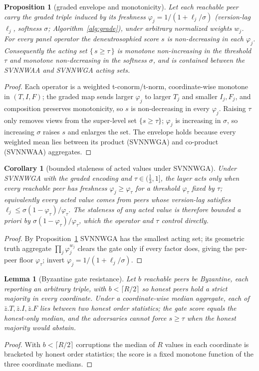 \documentclass[11pt]{article}
\newtheorem{proposition}{Proposition}
\newtheorem{lemma}{Lemma}
\newtheorem{corollary}{Corollary}
\begin{document}
\begin{proposition}[graded envelope and monotonicity]\label{prop:graded}
Let each reachable peer carry the graded triple induced by its freshness $\varphi_j=1/(1+\ell_j/\sigma)$
(version-lag $\ell_j$, softness $\sigma$; Algorithm~\ref{alg:grade}), under arbitrary normalized weights
$w_j$. For every panel operator the deneutrosophied score $s$ is non-decreasing in each $\varphi_j$.
Consequently the acting set $\{\,s\ge\tau\,\}$ is monotone non-increasing in the threshold $\tau$ and
monotone non-decreasing in the softness $\sigma$, and is contained between the SVNNWAA and SVNNWGA acting
sets.
\end{proposition}
\begin{proof}
Each operator is a weighted t-conorm/t-norm, coordinate-wise monotone in $(T,I,F)$; the graded map sends
larger $\varphi_j$ to larger $T_j$ and smaller $I_j,F_j$, and composition preserves monotonicity, so $s$
is non-decreasing in every $\varphi_j$. Raising $\tau$ only removes views from the super-level set
$\{s\ge\tau\}$; $\varphi_j$ is increasing in $\sigma$, so increasing $\sigma$ raises $s$ and enlarges the
set. The envelope holds because every weighted mean lies between its product (SVNNWGA) and co-product
(SVNNWAA) aggregates.
\end{proof}

\begin{corollary}[bounded staleness of acted values under SVNNWGA]\label{cor:lag}
Under SVNNWGA with the graded encoding and $\tau\in(\tfrac13,1]$, the layer acts only when every reachable
peer has freshness $\varphi_j\ge\varphi_\tau$ for a threshold $\varphi_\tau$ fixed by $\tau$; equivalently
every acted value comes from peers whose version-lag satisfies $\ell_j\le\sigma(1-\varphi_\tau)/\varphi_\tau$.
The staleness of any acted value is therefore bounded \emph{a priori} by
$\sigma(1-\varphi_\tau)/\varphi_\tau$, which the operator and $\tau$ control directly.
\end{corollary}
\begin{proof}
By Proposition~\ref{prop:graded} SVNNWGA has the smallest acting set; its geometric truth aggregate
$\prod_j\varphi_j^{w_j}$ clears the gate only if every factor does, giving the per-peer floor
$\varphi_\tau$; invert $\varphi_j=1/(1+\ell_j/\sigma)$.
\end{proof}

\begin{lemma}[Byzantine gate resistance]\label{lem:byz}
Let $b$ reachable peers be Byzantine, each reporting an arbitrary triple, with $b<\lceil R/2\rceil$ so
honest peers hold a strict majority \emph{in every coordinate}. Under a coordinate-wise median aggregate,
each of $\bar z.T,\bar z.I,\bar z.F$ lies between two honest order statistics; the gate score equals the
honest-only median, and the adversaries cannot force $s\ge\tau$ when the honest majority would abstain.
\end{lemma}
\begin{proof}
With $b<\lceil R/2\rceil$ corruptions the median of $R$ values in each coordinate is bracketed by honest
order statistics; the score is a fixed monotone function of the three coordinate medians.
\end{proof}
\end{document}
